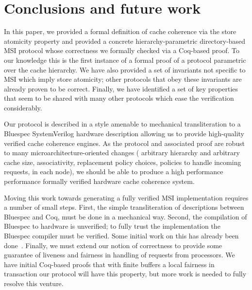 \section{Conclusions and future work}

In this paper, we provided a formal definition of cache coherence via the store
atomicity property and provided a concrete hierarchy-parametric directory-based
MSI protocol whose correctness we formally checked via a Coq-based proof. To our
knowledge this is the first instance of a formal proof of a protocol parametric
over the cache hierarchy. We have also provided a set of invariants not
specific to MSI which imply store atomicity; other protocols that obey these
invariants are already proven to be correct. Finally, we have identified a set
of key properties that seem to be shared with many other protocols which ease
the verification considerably.

Our protocol is described in a style amenable to mechanical transliteration to a
Bluespec SystemVerilog hardware description allowing us to provide high-quality
verified cache coherence engines. As the protocol and associated proof are robust
to many microarchitecture-oriented changes (\eg{} arbitrary hierarchy and
arbitrary cache size, associativity, replacement policy choices, policies to
handle incoming requests, \etc{} in each node), we should be able to produce a
high performance performance formally verified hardware cache coherence system.

Moving this work towards generating a fully verified MSI implementation
requires a number of small steps. First, the simple transliteration of
descriptions between Bluespec and Coq, must be done in a mechanical way.
Second, the compilation of Bluespec to hardware is unverified; to fully trust
the implementation the Bluespec compiler must be verified. Some initial work on
this has already been done~\cite{TDBLP:conf/cav/BraibantC13}. Finally, we must
extend our notion of correctness to provide some guarantee of
liveness and fairness in handling of requests from processors. We have
initial Coq-based proofs that with finite buffers a local fairness in
transaction our protocol will have this property, but more work is needed to
fully resolve this venture. 






